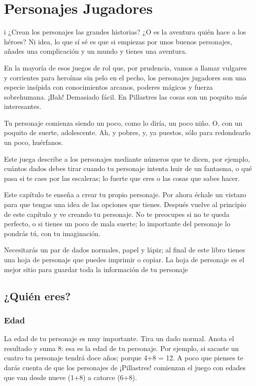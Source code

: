 \chapter{Personajes Jugadores}
i
¿Crean los personajes las grandes historias? ¿O es la aventura quién hace a los héroes? Ni idea, lo que sí sé es que si empiezas por unos buenos personajes, añades una complicación y un mundo y tienes una aventura. 

En la mayoría de esos juegos de rol que, por prudencia, vamos a llamar vulgares y corrientes para heroínas sin pelo en el pecho, los personajes jugadores son una especie insípida con conocimientos arcanos, poderes mágicos y fuerza sobrehumana. ¡Bah! Demasiado fácil. En Pillastres las cosas son un poquito más interesantes.

Tu personaje comienza siendo un poco, como lo diría, un poco niño. O, con un poquito de suerte, adolescente. Ah, y pobres, y, ya puestos, sólo para redondearlo un poco, huérfanos.

Este juega describe a los personajes mediante números que te dicen, por ejemplo, cuántos dados debes tirar cuando tu personaje intenta huir de un fantasma, o qué pasa si te caes por las escaleras; lo fuerte que eres o las cosas que sabes hacer.


Este capítulo te enseña a crear tu propio personaje. Por ahora échale un vistazo para que tengas una idea de las opciones que tienes. Después vuelve al principio de este capítulo y ve creando tu personaje. No te preocupes si no te queda perfecto, o si tienes un poco de mala suerte; lo importante del personaje lo pondrás tú, con tu imaginación.

Necesitarás un par de dados normales, papel y lápiz; al final de este libro tienes una hoja de personaje que puedes imprimir o copiar. La hoja de personaje es el mejor sitio para guardar toda la información de tu personaje 

\section{¿Quién eres?}

\subsection*{Edad}

La edad de tu personaje es muy importante. Tira un dado normal. Anota el resultado y suma 8: esa es la edad de tu personaje. Por ejemplo, si sacaste un cuatro tu personaje tendrá doce años; porque 4+8 = 12. A poco que pienses te darás cuenta de que los personajes de ¡Pillastres! comienzan el juego con edades que van desde nueve (1+8) a catorce (6+8).


